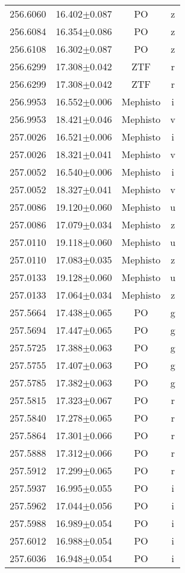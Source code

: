 \begin{table}
\begin{tabular}{cccc}
256.6060 & 16.402$\pm$0.087 & PO & z \\
256.6084 & 16.354$\pm$0.086 & PO & z \\
256.6108 & 16.302$\pm$0.087 & PO & z \\
256.6299 & 17.308$\pm$0.042 & ZTF & r \\
256.6299 & 17.308$\pm$0.042 & ZTF & r \\
256.9953 & 16.552$\pm$0.006 & Mephisto & i \\
256.9953 & 18.421$\pm$0.046 & Mephisto & v \\
257.0026 & 16.521$\pm$0.006 & Mephisto & i \\
257.0026 & 18.321$\pm$0.041 & Mephisto & v \\
257.0052 & 16.540$\pm$0.006 & Mephisto & i \\
257.0052 & 18.327$\pm$0.041 & Mephisto & v \\
257.0086 & 19.120$\pm$0.060 & Mephisto & u \\
257.0086 & 17.079$\pm$0.034 & Mephisto & z \\
257.0110 & 19.118$\pm$0.060 & Mephisto & u \\
257.0110 & 17.083$\pm$0.035 & Mephisto & z \\
257.0133 & 19.128$\pm$0.060 & Mephisto & u \\
257.0133 & 17.064$\pm$0.034 & Mephisto & z \\
257.5664 & 17.438$\pm$0.065 & PO & g \\
257.5694 & 17.447$\pm$0.065 & PO & g \\
257.5725 & 17.388$\pm$0.063 & PO & g \\
257.5755 & 17.407$\pm$0.063 & PO & g \\
257.5785 & 17.382$\pm$0.063 & PO & g \\
257.5815 & 17.323$\pm$0.067 & PO & r \\
257.5840 & 17.278$\pm$0.065 & PO & r \\
257.5864 & 17.301$\pm$0.066 & PO & r \\
257.5888 & 17.312$\pm$0.066 & PO & r \\
257.5912 & 17.299$\pm$0.065 & PO & r \\
257.5937 & 16.995$\pm$0.055 & PO & i \\
257.5962 & 17.044$\pm$0.056 & PO & i \\
257.5988 & 16.989$\pm$0.054 & PO & i \\
257.6012 & 16.988$\pm$0.054 & PO & i \\
257.6036 & 16.948$\pm$0.054 & PO & i \\

\end{tabular}
\end{table}
